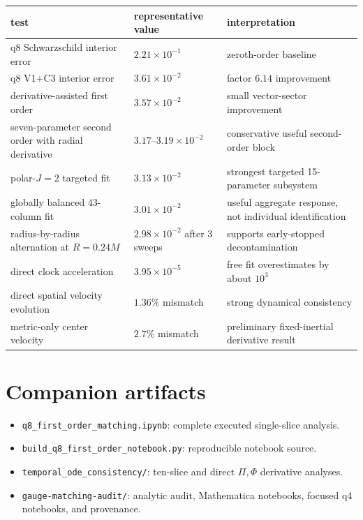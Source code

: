 \documentclass[11pt]{article}
\begin{document}
\begin{center}
\small
\begin{tabularx}{0.98\textwidth}{
  >{\raggedright\arraybackslash}p{}
  >{\raggedright\arraybackslash}p{}X}
\toprule
\textbf{test} & \textbf{representative value} & \textbf{interpretation}\\
\midrule
q8 Schwarzschild interior error & \(2.21\times10^{-1}\) &
zeroth-order baseline\\
q8 V1+C3 interior error & \(3.61\times10^{-2}\) &
factor \(6.14\) improvement\\
derivative-assisted first order & \(3.57\times10^{-2}\) &
small vector-sector improvement\\
seven-parameter second order with radial derivative &
\(3.17\)--\(3.19\times10^{-2}\) &
conservative useful second-order block\\
polar-\(J=2\) targeted fit & \(3.13\times10^{-2}\) &
strongest targeted 15-parameter subsystem\\
globally balanced 43-column fit & \(3.01\times10^{-2}\) &
useful aggregate response, not individual identification\\
radius-by-radius alternation at \(R=0.24M\) &
\(2.98\times10^{-2}\) after 3 sweeps &
supports early-stopped decontamination\\
direct clock acceleration & \(3.95\times10^{-5}\) &
free fit overestimates by about \(10^3\)\\
direct spatial velocity evolution & \(1.36\%\) mismatch &
strong dynamical consistency\\
metric-only center velocity & \(2.7\%\) mismatch &
preliminary fixed-inertial derivative result\\
\bottomrule
\end{tabularx}
\end{center}

\section{Companion artifacts}

\begin{itemize}
  \item \texttt{q8\_first\_order\_matching.ipynb}: complete executed
        single-slice analysis.
  \item \texttt{build\_q8\_first\_order\_notebook.py}: reproducible notebook
        source.
  \item \texttt{temporal\_ode\_consistency/}: ten-slice and direct
        \(\Pi,\Phi\) derivative analyses.
  \item \texttt{gauge-matching-audit/}: analytic audit, Mathematica notebooks,
        focused q4 notebooks, and provenance.
\end{itemize}
\end{document}
